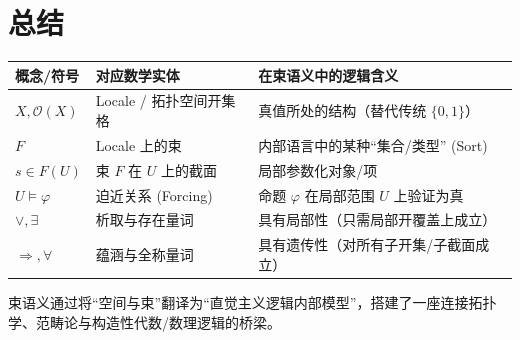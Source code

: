 \documentclass[12pt,a4paper]{article}
\begin{document}
\section{总结}

\begin{center}
\begin{tabular}{|p{4cm}|p{3.5cm}|p{7cm}|}
\hline
\textbf{概念/符号} & \textbf{对应数学实体} & \textbf{在束语义中的逻辑含义} \\
\hline
$X, \mathcal{O}(X)$ & Locale / 拓扑空间开集格 & 真值所处的结构（替代传统 $\{0,1\}$） \\
\hline
$F$ & Locale 上的束 & 内部语言中的某种“集合/类型” (Sort) \\
\hline
$s \in F(U)$ & 束 $F$ 在 $U$ 上的截面 & 局部参数化对象/项 \\
\hline
$U \models \varphi$ & 迫近关系 (Forcing) & 命题 $\varphi$ 在局部范围 $U$ 上验证为真 \\
\hline
$\vee, \exists$ & 析取与存在量词 & 具有局部性（只需局部开覆盖上成立） \\
\hline
$\Rightarrow, \forall$ & 蕴涵与全称量词 & 具有遗传性（对所有子开集/子截面成立） \\
\hline
\end{tabular}
\end{center}

束语义通过将“空间与束”翻译为“直觉主义逻辑内部模型”，搭建了一座连接拓扑学、范畴论与构造性代数/数理逻辑的桥梁。
\end{document}
